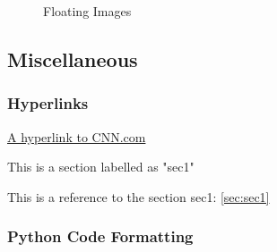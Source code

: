\begin{figure}[!ht]
	\centering
	\caption{Floating Images}%
	\label{fig:floatimage}%
\end{figure}


\subsection{Miscellaneous}

\subsubsection{Hyperlinks}
\href{https://www.cnn.com}{A hyperlink to CNN.com}

This is a section labelled as "sec1"
\label{sec:sec1}

This is a reference to the section sec1: \ref{sec:sec1}


\subsubsection{Python Code Formatting}


